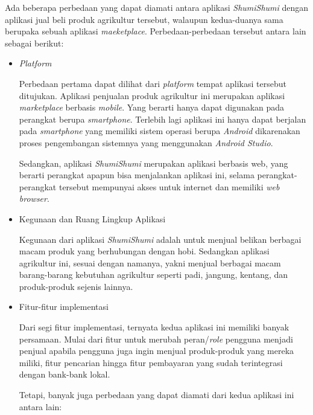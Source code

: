 \documentclass[a4paper]{article}
\begin{document}
\begin{itemize}
\begin{enumerate}
        Ada beberapa perbedaan yang dapat diamati antara aplikasi \textit{ShumiShumi} dengan aplikasi jual beli produk agrikultur tersebut, walaupun kedua-duanya sama berupaka sebuah aplikasi \textit{maeketplace}. Perbedaan-perbedaan tersebut antara lain sebagai berikut:
    
        \begin{itemize}
            \item \textit{Platform}
    
            Perbedaan pertama dapat dilihat dari \textit{platform} tempat aplikasi tersebut ditujukan. Aplikasi penjualan produk agrikultur ini merupakan aplikasi \textit{marketplace} berbasis \textit{mobile}. Yang berarti hanya dapat digunakan pada perangkat berupa \textit{smartphone}. Terlebih lagi aplikasi ini hanya dapat berjalan pada \textit{smartphone} yang memiliki sistem operasi berupa \textit{Android} dikarenakan proses pengembangan sistemnya yang menggunakan \textit{Android Studio}\autocite{agriculture-marketplace}.
    
            Sedangkan, aplikasi \textit{ShumiShumi} merupakan aplikasi berbasis web, yang berarti perangkat apapun bisa menjalankan aplikasi ini, selama perangkat-perangkat tersebut mempunyai akses untuk internet dan memiliki \textit{web browser}.
    
            \item Kegunaan dan Ruang Lingkup Aplikasi
    
            Kegunaan dari aplikasi \textit{ShumiShumi} adalah untuk menjual belikan berbagai macam produk yang berhubungan dengan hobi. Sedangkan aplikasi agrikultur ini, sesuai dengan namanya, yakni menjual berbagai macam barang-barang kebutuhan agrikultur seperti padi, jangung, kentang, dan produk-produk sejenis lainnya\autocite{agriculture-marketplace}.
    
            \item Fitur-fitur implementasi
    
            Dari segi fitur implementasi, ternyata kedua aplikasi ini memiliki banyak persamaan. Mulai dari fitur untuk merubah peran/\textit{role} pengguna menjadi penjual apabila pengguna juga ingin menjual produk-produk yang mereka miliki, fitur pencarian hingga fitur pembayaran yang sudah terintegrasi dengan bank-bank lokal.
    
            Tetapi, banyak juga perbedaan yang dapat diamati dari kedua aplikasi ini antara lain:
    

\end{itemize}
\end{enumerate}
\end{itemize}
\end{document}
